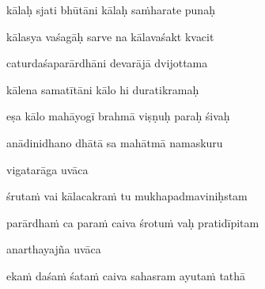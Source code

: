 kālaḥ sjati bhūtāni kālaḥ sa\.mharate punaḥ\thinspace{\dandab} \dontdisplaylinenum

kālasya vaśagāḥ sarve na kālavaśakt kvacit \veg\dontdisplaylinenum

caturdaśaparārdhāni devarājā dvijottama\thinspace{\dandab} \dontdisplaylinenum

kālena samatītāni kālo hi duratikramaḥ \veg\dontdisplaylinenum

eṣa kālo mahāyogī brahmā viṣṇuḥ paraḥ śivaḥ\thinspace{\dandab} \dontdisplaylinenum

anādinidhano dhātā sa mahātmā namaskuru \veg\dontdisplaylinenum


vigatarāga uvāca~{\dandab}\dontdisplaylinenum 

śruta\.m vai kālacakra\.m tu mukhapadmaviniḥstam\thinspace{\danda} \dontdisplaylinenum

parārdha\.m ca para\.m caiva śrotu\.m vaḥ pratidīpitam \veg\dontdisplaylinenum

anarthayajña uvāca~{\dandab}\dontdisplaylinenum 

eka\.m daśa\.m śata\.m caiva sahasram ayuta\.m tathā\thinspace{\danda} \dontdisplaylinenum

